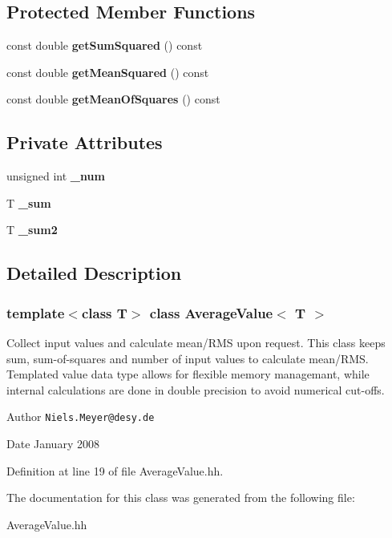 \subsection*{Protected Member Functions}
\begin{DoxyCompactItemize}
\item 
const double {\bfseries getSumSquared} () const \label{classAverageValue_ad6b203c7b59b20a41eeb1583cd13d860}

\item 
const double {\bfseries getMeanSquared} () const \label{classAverageValue_a2bc4c1917b65d3e0059fdef4cc5483b7}

\item 
const double {\bfseries getMeanOfSquares} () const \label{classAverageValue_a7ebd28e0898ddb72fed239a8ef0aad27}

\end{DoxyCompactItemize}
\subsection*{Private Attributes}
\begin{DoxyCompactItemize}
\item 
unsigned int {\bfseries \_\-num}\label{classAverageValue_a889761bd8e0c8677fb24fdd867cc6f36}

\item 
T {\bfseries \_\-sum}\label{classAverageValue_a1b42f1de1fbe48182dc99f5a29bc80e7}

\item 
T {\bfseries \_\-sum2}\label{classAverageValue_ade9ce93c3c9fbba50e9462e43e5b0e0e}

\end{DoxyCompactItemize}


\subsection{Detailed Description}
\subsubsection*{template$<$class T$>$ class AverageValue$<$ T $>$}

Collect input values and calculate mean/RMS upon request. This class keeps sum, sum-\/of-\/squares and number of input values to calculate mean/RMS. Templated value data type allows for flexible memory managemant, while internal calculations are done in double precision to avoid numerical cut-\/offs.

\begin{DoxyAuthor}{Author}
{\tt Niels.Meyer@desy.de} 
\end{DoxyAuthor}
\begin{DoxyDate}{Date}
January 2008 
\end{DoxyDate}


Definition at line 19 of file AverageValue.hh.

The documentation for this class was generated from the following file:\begin{DoxyCompactItemize}
\item 
AverageValue.hh\end{DoxyCompactItemize}
